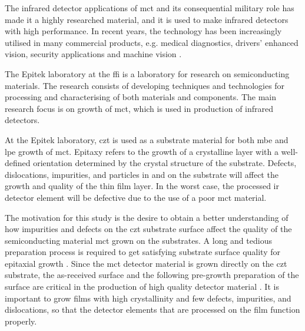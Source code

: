 The infrared detector applications of \ac{mct} and its consequential military role has made it a highly researched material, and it is used to make infrared detectors with high performance. In recent years, the technology has been increasingly utilised in many commercial products, e.g. medical diagnostics, drivers' enhanced vision, security applications and machine vision \citep{dhar2013advances}.

The Epitek laboratory at the \ac{ffi} is a laboratory for research on semiconducting materials. The research consists of developing techniques and technologies for processing and characterising of both materials and components. The main research focus is on growth of \ac{mct}, which is used in production of infrared detectors. 

At the Epitek laboratory, \ac{czt} is used as a substrate material for both \ac{mbe} and \ac{lpe} growth of \ac{mct}. Epitaxy refers to the growth of a crystalline layer with a well-defined orientation determined by the crystal structure of the substrate. Defects, dislocations, impurities, and particles in and on the substrate will affect the growth and quality of the thin film layer. In the worst case, the processed \ac{ir} detector element will be defective due to the use of a poor \ac{mct} material. %

The motivation for this study is the desire to obtain a better understanding of how impurities and defects on the \ac{czt} substrate surface affect the quality of the semiconducting material \ac{mct} grown on the substrates. A long and tedious preparation process is required to get satisfying substrate surface quality for epitaxial growth \citep{triboulet2009cdteI}. Since the \ac{mct} detector material is grown directly on the \ac{czt} substrate, the as-received surface and the following pre-growth preparation of the surface are critical in the production of high quality detector material \citep{benson2015as-received}. It is important to grow films with high crystallinity and few defects, impurities, and dislocations, so that the detector elements that are processed on the film function properly.

